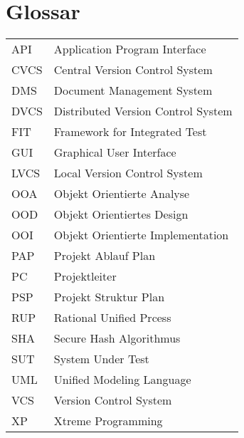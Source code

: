 \section*{Glossar}
\begin{tabular}{ll}
   API  & Application Program Interface \\ 
   CVCS & Central Version Control System \\ 
   DMS  & Document Management System \\ 
   DVCS & Distributed Version Control System \\ 
   FIT  & Framework for Integrated Test\\
   GUI  & Graphical User Interface \\ 
   LVCS & Local Version Control System\\ 
   OOA  & Objekt Orientierte Analyse\\
   OOD  & Objekt Orientiertes Design\\
   OOI  & Objekt Orientierte Implementation\\
   PAP  & Projekt Ablauf Plan\\ 
   PC   & Projektleiter\\ 
   PSP  & Projekt Struktur Plan\\ 
   RUP  & Rational Unified Prcess\\
   SHA  & Secure Hash Algorithmus\\ 
   SUT  & System Under Test\\
   UML  & Unified Modeling Language\\
   VCS  & Version Control System\\ 
   XP   & Xtreme Programming \\ 
\end{tabular} 